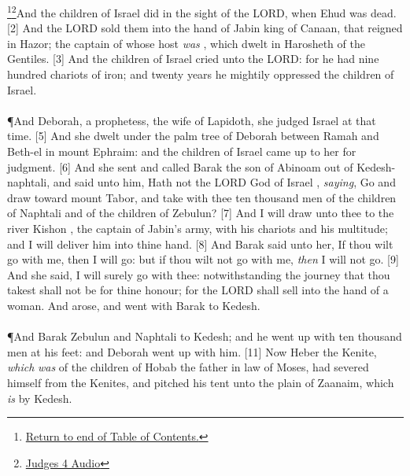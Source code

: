 \footnote{\textcolor[rgb]{0.00,0.25,0.00}{\hyperlink{JudgesTOC}{Return to end of Table of Contents.}}}\footnote{\href{https://audiobible.com/bible/judges_4.html}{\textcolor[cmyk]{0.99998,1,0,0}{Judges 4 Audio}}}\textcolor[cmyk]{0.99998,1,0,0}{And the children of Israel  did  in the sight of the LORD, when Ehud was dead.}
[2] \textcolor[cmyk]{0.99998,1,0,0}{And the LORD sold them into the hand of Jabin king of Canaan, that reigned in Hazor; the captain of whose host \emph{was} , which dwelt in Harosheth of the Gentiles.}
[3] \textcolor[cmyk]{0.99998,1,0,0}{And the children of Israel cried unto the LORD: for he had nine hundred chariots of iron; and twenty years he mightily oppressed the children of Israel.}\\
\\
\P \textcolor[cmyk]{0.99998,1,0,0}{And Deborah, a prophetess, the wife of Lapidoth, she judged Israel at that time.}
[5] \textcolor[cmyk]{0.99998,1,0,0}{And she dwelt under the palm tree of Deborah between Ramah and Beth-el in mount Ephraim: and the children of Israel came up to her for judgment.}
[6] \textcolor[cmyk]{0.99998,1,0,0}{And she sent and called Barak the son of Abinoam out of Kedesh-naphtali, and said unto him, Hath not the LORD God of Israel , \emph{saying}, Go and draw toward mount Tabor, and take with thee ten thousand men of the children of Naphtali and of the children of Zebulun?}
[7] \textcolor[cmyk]{0.99998,1,0,0}{And I will draw unto thee to the river Kishon , the captain of Jabin's army, with his chariots and his multitude; and I will deliver him into thine hand.}
[8] \textcolor[cmyk]{0.99998,1,0,0}{And Barak said unto her, If thou wilt go with me, then I will go: but if thou wilt not go with me, \emph{then} I will not go.}
[9] \textcolor[cmyk]{0.99998,1,0,0}{And she said, I will surely go with thee: notwithstanding the journey that thou takest shall not be for thine honour; for the LORD shall sell  into the hand of a woman. And  arose, and went with Barak to Kedesh.}\\
\\
\P \textcolor[cmyk]{0.99998,1,0,0}{And Barak  Zebulun and Naphtali to Kedesh; and he went up with ten thousand men at his feet: and Deborah went up with him.}
[11] \textcolor[cmyk]{0.99998,1,0,0}{Now Heber the Kenite, \emph{which} \emph{was} of the children of Hobab the father in law of Moses, had severed himself from the Kenites, and pitched his tent unto the plain of Zaanaim, which \emph{is} by Kedesh.}
